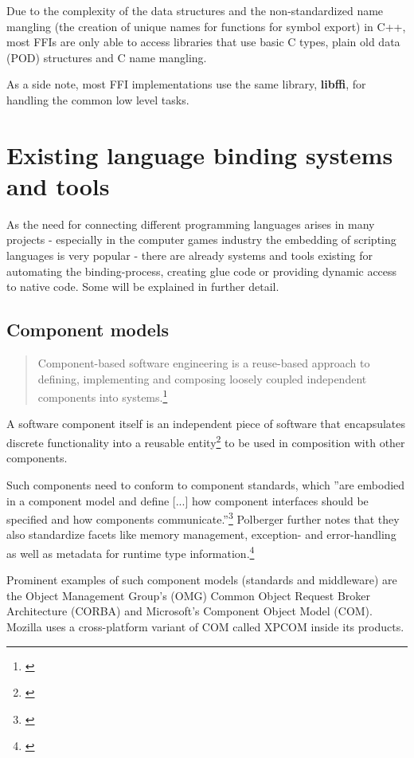
Due to the complexity of the data structures and the non-standardized name mangling (the creation of unique names for functions for symbol export) in C++, most FFIs are only able to access libraries that use basic C types, plain old data (POD) structures and C name mangling.

As a side note, most FFI implementations use the same library, \textbf{libffi}, for handling the common low level tasks.

\section{Existing language binding systems and tools}

As the need for connecting different programming languages arises in many projects - especially in the computer games industry the embedding of scripting languages is very popular - there are already systems and tools existing for automating the binding-process, creating glue code or providing dynamic access to native code. Some will be explained in further detail.

\subsection{Component models}

\begin{quotation}
Component-based software engineering is a reuse-based approach to defining, implementing and composing loosely coupled independent components into systems.\footnote{\citep[460]{Sommerville}}
\end{quotation}

A software component itself is an independent piece of software that encapsulates discrete functionality into a reusable entity\footnote{\citep[3]{ComponentTechnology}} to be used in composition with other components.

Such components need to conform to component standards, which ''are embodied in a component model and define [...] how component interfaces should be specified and how components communicate.''\footnote{\citep[440]{Sommerville}} Polberger further notes that they also standardize facets like memory management, exception- and error-handling as well as metadata for runtime type information.\footnote{\citep[8]{ComponentTechnology}}

Prominent examples of such component models (standards and middleware) are the Object Management Group's (OMG) Common Object Request Broker Architecture (CORBA) and Microsoft's Component Object Model (COM). Mozilla uses a cross-platform variant of COM called XPCOM inside its products.

